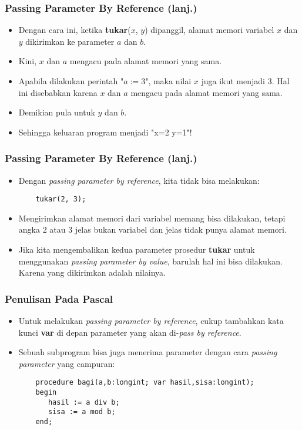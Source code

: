 \documentclass{beamer}
\begin{document}
\begin{frame}[fragile]
\frametitle{Passing Parameter By Reference (lanj.)}
\begin{itemize}
	\item Dengan cara ini, ketika \textbf{tukar}($x$, $y$) dipanggil, \alert{alamat memori variabel} $x$ dan $y$ dikirimkan ke parameter $a$ dan $b$.
	\item Kini, $x$ dan $a$ mengacu pada alamat memori yang sama. 
	\item Apabila dilakukan perintah "$a := 3$", maka nilai $x$ juga ikut menjadi 3. Hal ini disebabkan karena $x$ dan $a$ mengacu pada \alert{alamat memori yang sama}.
	\item Demikian pula untuk $y$ dan $b$.
	\item Sehingga keluaran program menjadi "x=2 y=1"!
\end{itemize}
\end{frame}

\begin{frame}[fragile]
\frametitle{Passing Parameter By Reference (lanj.)}
\begin{itemize}
	\item Dengan \textit{passing parameter by reference}, kita tidak bisa melakukan:
	\begin{lstlisting}
	tukar(2, 3); 
	\end{lstlisting}
	
	\item Mengirimkan alamat memori dari variabel memang bisa dilakukan, tetapi angka 2 atau 3 jelas bukan variabel dan jelas \alert{tidak punya alamat memori}.
	\item Jika kita mengembalikan kedua parameter prosedur \textbf{tukar} untuk menggunakan \textit{passing parameter by value}, barulah hal ini bisa dilakukan. Karena yang dikirimkan adalah \alert{nilainya}.
\end{itemize}
\end{frame}

\begin{frame}[fragile]
\frametitle{Penulisan Pada Pascal}
\begin{itemize}
	\item Untuk melakukan \textit{passing parameter by reference}, cukup tambahkan kata kunci \textbf{var} di depan parameter yang akan di-\textit{pass by reference}.
	\item Sebuah subprogram bisa juga menerima parameter dengan cara \textit{passing parameter} yang campuran:
	\begin{lstlisting}
	procedure bagi(a,b:longint; var hasil,sisa:longint);
	begin
	   hasil := a div b;
	   sisa := a mod b;
	end;	
	\end{lstlisting}
\end{itemize}
\end{frame}
\end{document}
